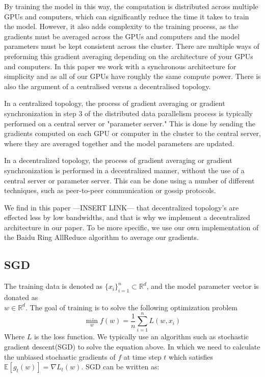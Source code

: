\documentclass[11pt]{article}
\begin{document}
By training the model in this way, the computation is distributed across multiple GPUs and computers, which can significantly reduce the time it takes to train the model. However, it also adds complexity to the training process, as the gradients must be averaged across the GPUs and computers and the model parameters must be kept consistent across the cluster. There are multiple ways of preforming this gradient averaging depending on the architecture of your GPUs and computers. In this paper we work with a synchronous architecture for simplicity and as all of our GPUs have roughly the same compute power. There is also the argument of a centralised versus a decentralised topology.

In a centralized topology, the process of gradient averaging or gradient synchronization in step 3 of the distributed data parallelism process is typically performed on a central server or "parameter server." This is done by sending the gradients computed on each GPU or computer in the cluster to the central server, where they are averaged together and the model parameters are updated.

In a decentralized topology, the process of gradient averaging or gradient synchronization is performed in a decentralized manner, without the use of a central server or parameter server. This can be done using a number of different techniques, such as peer-to-peer communication or gossip protocols.

We find in this paper ---INSERT LINK--- that decentralized topology's are effected less by low bandwidths, and that is why we implement a decentralized architecture in our paper. To be more specific, we use our own implementation of the Baidu Ring AllReduce algorithm to average our gradients.

\subsection{SGD}

The training data is denoted as $\{x_i\}^n_{i=1} \subset \mathbb{R}^d$, and the model parameter vector is donated as\\ $w \in \mathbb{R}^d$. The goal of training is to solve the following optimization problem 
$$
\min_w f
(w) = \frac{1}{n} \sum^n_{i=1}L(w,x_i)
$$
Where $L$ is the loss function. We typically use an algorithm such as stochastic gradient descent(SGD) to solve the equation above. In which we need to calculate the unbiased stochastic gradients of $f$ at time step $t$ which satisfies $\mathbb{E}[g_t(w)] = {\nabla} L_t(w)$. SGD can be written as:
\end{document}
